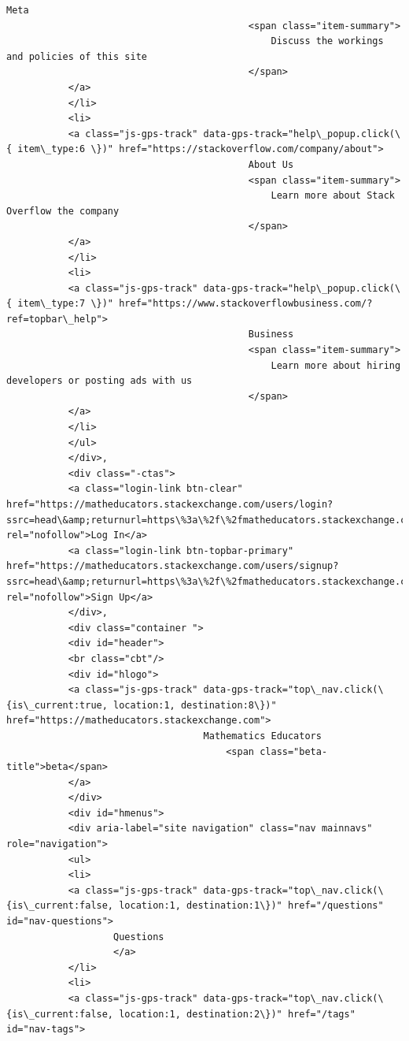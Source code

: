 \documentclass[11pt]{article}
\begin{document}
\begin{Verbatim}[commandchars=\\\{\}]
                                           Meta
                                           <span class="item-summary">
                                               Discuss the workings and policies of this site
                                           </span>
           </a>
           </li>
           <li>
           <a class="js-gps-track" data-gps-track="help\_popup.click(\{ item\_type:6 \})" href="https://stackoverflow.com/company/about">
                                           About Us
                                           <span class="item-summary">
                                               Learn more about Stack Overflow the company
                                           </span>
           </a>
           </li>
           <li>
           <a class="js-gps-track" data-gps-track="help\_popup.click(\{ item\_type:7 \})" href="https://www.stackoverflowbusiness.com/?ref=topbar\_help">
                                           Business
                                           <span class="item-summary">
                                               Learn more about hiring developers or posting ads with us
                                           </span>
           </a>
           </li>
           </ul>
           </div>,
           <div class="-ctas">
           <a class="login-link btn-clear" href="https://matheducators.stackexchange.com/users/login?ssrc=head\&amp;returnurl=https\%3a\%2f\%2fmatheducators.stackexchange.com\%2f" rel="nofollow">Log In</a>
           <a class="login-link btn-topbar-primary" href="https://matheducators.stackexchange.com/users/signup?ssrc=head\&amp;returnurl=https\%3a\%2f\%2fmatheducators.stackexchange.com\%2f" rel="nofollow">Sign Up</a>
           </div>,
           <div class="container ">
           <div id="header">
           <br class="cbt"/>
           <div id="hlogo">
           <a class="js-gps-track" data-gps-track="top\_nav.click(\{is\_current:true, location:1, destination:8\})" href="https://matheducators.stackexchange.com">
                                   Mathematics Educators
                                       <span class="beta-title">beta</span>
           </a>
           </div>
           <div id="hmenus">
           <div aria-label="site navigation" class="nav mainnavs" role="navigation">
           <ul>
           <li>
           <a class="js-gps-track" data-gps-track="top\_nav.click(\{is\_current:false, location:1, destination:1\})" href="/questions" id="nav-questions">
                   Questions
                   </a>
           </li>
           <li>
           <a class="js-gps-track" data-gps-track="top\_nav.click(\{is\_current:false, location:1, destination:2\})" href="/tags" id="nav-tags">

\end{Verbatim}
\end{document}
